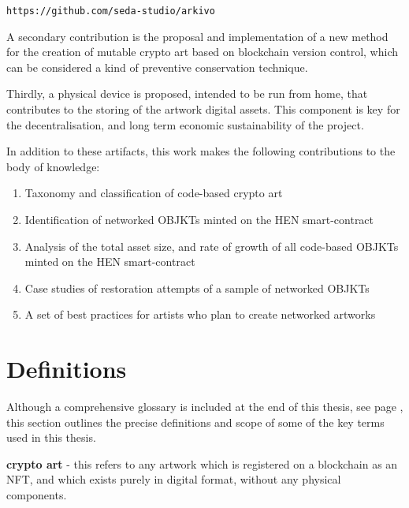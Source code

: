 \texttt{https://github.com/seda-studio/arkivo}

\vspace{0.5cm}

A secondary contribution is the proposal and implementation of a new method for the creation of mutable crypto art based on blockchain version control, which can be considered a kind of preventive conservation technique.

Thirdly, a physical device is proposed, intended to be run from home, that contributes to the storing of the artwork digital assets. This component is key for the decentralisation, and long term economic sustainability of the project. 

\vspace{0.5cm}

In addition to these artifacts, this work makes the following contributions to the body of knowledge:

\begin{enumerate}
    \item Taxonomy and classification of code-based crypto art
    \item Identification of networked OBJKTs minted on the HEN smart-contract
    \item Analysis of the total asset size, and rate of growth of all code-based OBJKTs minted on the HEN smart-contract
    \item Case studies of restoration attempts of a sample of networked OBJKTs
    \item A set of best practices for artists who plan to create networked artworks
\end{enumerate}


\section{Definitions}
\label{sec:definitions}

Although a comprehensive glossary is included at the end of this thesis, see page \pageref{sec:glossary}, this section outlines the precise definitions and scope of some of the key terms used in this thesis.

\vspace{0.5cm}

\textbf{crypto art} - this refers to any artwork which is registered on a blockchain as an NFT, and which exists purely in digital format, without any physical components.

\vspace{0.5cm}

